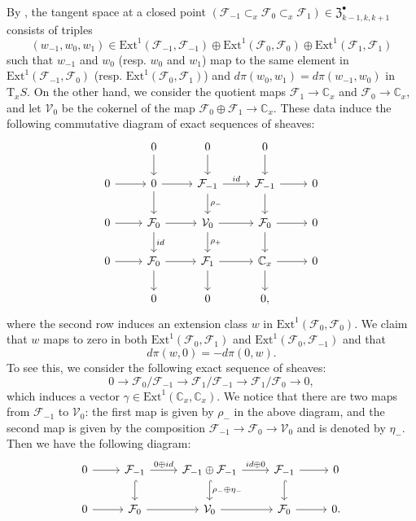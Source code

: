 \documentclass{amsart}
\numberwithin{equation}{section}
\newcommand\mc{\mathcal}
\newcommand\mf{\mathfrak}
\newcommand\mb{\mathbb}
\theoremstyle{definition}
\theoremstyle{remark}
\begin{document}
By \cite{neguct2018hecke}, the tangent space at a closed point $(\mc{F}_{-1}\subset_x \mc{F}_{0}\subset_x \mc{F}_1)\in \mf{Z}_{k-1,k,k+1}^{\bullet}$
consists of triples 
  \begin{equation*}
    (w_{-1},w_{0},w_{1})\in \mathrm{Ext}^1(\mc{F}_{-1},\mc{F}_{-1})\oplus \mathrm{Ext}^1(\mc{F}_{0},\mc{F}_{0})\oplus \mathrm{Ext}^1(\mc{F}_{1},\mc{F}_{1})
  \end{equation*}
  such that $w_{-1}$ and $w_{0}$ (resp. $w_0$ and $w_1$) map to the same element in $\mathrm{Ext}^1(\mc{F}_{-1},\mc{F}_{0})$ (resp. $\mathrm{Ext}^1(\mc{F}_{0},\mc{F}_{1})$) and $d\pi(w_0,w_1)=d\pi(w_{-1},w_0)$ in $\mathrm{T}_x S$. On the other hand, we consider the quotient maps $\mc{F}_1\to \mb{C}_x$ and $\mc{F}_{0}\to \mb{C}_x$, and let $\mc{V}_0$ be the cokernel of the map $\mc{F}_0\oplus \mc{F}_1\to \mb{C}_x$. These data induce the following commutative diagram of exact sequences of sheaves:
\begin{equation}
  \label{eq:1.10}
  \begin{tikzcd}
    & 0 \ar{d} & 0 \ar{d} & 0 \ar{d} \\ 
    0 \ar{r} & 0 \ar{r}\ar{d} & \mc{F}_{-1} \ar{r}{id}\ar{d}{\rho_-} & \mc{F}_{-1}\ar{d} \ar{r} & 0 \\
    0 \ar{r} & \mc{F}_0 \ar{d}{id} \ar{r} & \mc{V}_0 \ar{d}{\rho_+} \ar{r} & \mc{F}_0 \ar{r} \ar{d}& 0 \\
    0 \ar{r} & \mc{F}_0 \ar{r} \ar{d} & \mc{F}_1 \ar{r} \ar{d} & \mb{C}_x \ar{r} \ar{d} & 0 \\
      & 0 & 0 & 0,
  \end{tikzcd}
\end{equation}
where the second row induces an extension class $w$ in $\mathrm{Ext}^1(\mc{F}_0,\mc{F}_0)$. We claim that $w$ maps to zero in both $\mathrm{Ext}^1(\mc{F}_0,\mc{F}_1)$ and $\mathrm{Ext}^1(\mc{F}_0,\mc{F}_{-1})$ and that $$d\pi(w,0)=-d\pi(0,w).$$ 
To see this, we consider the following exact sequence of sheaves:
\begin{equation*}
  0\to \mc{F}_{0}/\mc{F}_{-1}\to \mc{F}_1/\mc{F}_{-1}\to \mc{F}_1/\mc{F}_{0}\to 0,
\end{equation*}
which induces a vector $\gamma \in \mathrm{Ext}^1(\mb{C}_x,\mb{C}_x)$. We notice that 
there are two maps from $\mc{F}_{-1}$ to $\mc{V}_0$: the first map is given by $\rho_-$ in the above diagram, and the second map is given by the composition $\mc{F}_{-1}\to \mc{F}_0\to \mc{V}_0$ and is denoted by $\eta_-$. Then we have the following diagram:
\begin{equation*}
  \begin{tikzcd}
     0\ar{r} & \mc{F}_{-1} \ar[r,"0\oplus id"] \ar[d,hook] & \mc{F}_{-1}\oplus \mc{F}_{-1} \ar[r,"id\oplus 0"] \ar[d,"\rho_-\oplus \eta_-",hook] & \mc{F}_{-1} \ar[r] \ar[d,hook]  & 0  \\
     0 \ar{r} & \mc{F}_0 \ar{r}& \mc{V}_0 \ar{r} & \mc{F}_0 \ar{r} & 0.
  \end{tikzcd}
\end{equation*}
\end{document}
